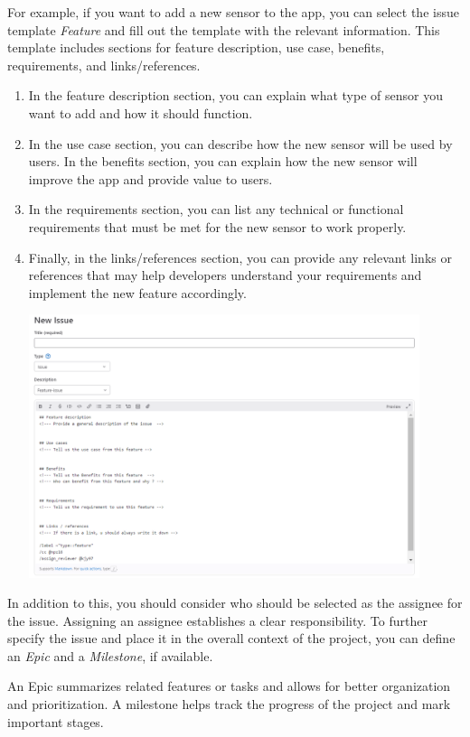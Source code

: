 \documentclass[12pt]{article}
\begin{document}
For example, if you want to add a new sensor to the app, you can select the issue template \textit{Feature} and fill out the template with the relevant information. This template includes sections for feature description, use case, benefits, requirements, and links/references. 
 \begin{enumerate}
      \item
      In the feature description section, you can explain what type of sensor you want to add and how it should function. 
      \item
      In the use case section, you can describe how the new sensor will be used by users. In the benefits section, you can explain how the new sensor will improve the app and provide value to users. 
      \item
      In the requirements section, you can list any technical or functional requirements that must be met for the new sensor to work properly. 
      \item
      Finally, in the links/references section, you can provide any relevant links or references that may help developers understand your requirements and implement the new feature accordingly. 
      

    \includegraphics[width=0.9\textwidth]{issue.png}
  
 \end{enumerate}

In addition to this, you should consider who should be selected as the assignee for the issue. Assigning an assignee establishes a clear responsibility. To further specify the issue and place it in the overall context of the project, you can define an \textit{Epic} and a \textit{Milestone}, if available. 

An Epic summarizes related features or tasks and allows for better organization and prioritization. 
A milestone helps track the progress of the project and mark important stages.
\end{document}
